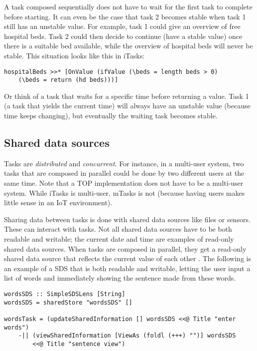 
A task composed sequentially does not have to wait for the first task to complete before starting. It can even be the case that task 2 becomes stable when task 1 still has an unstable value. For example, task 1 could give an overview of free hospital beds. Task 2 could then decide to continue (have a stable value) once there is a suitable bed available, while the overview of hospital beds will never be stable. This situation looks like this in iTasks:

\bigskip\noindent
\begin{verbatim}
hospitalBeds >>* [OnValue (ifValue (\beds = length beds > 0)
    (\beds = return (hd beds)))]
\end{verbatim}

\bigskip
Or think of a task that waits for a specific time before returning a value. Task 1 (a task that yields the current time) will always have an unstable value (because time keeps changing), but eventually the waiting task becomes stable.

\subsection{Shared data sources}\label{section-top-sds}
Tasks are \textit{distributed} and \textit{concurrent}. For instance, in a multi-user system, two tasks that are composed in parallel could be done by two different users at the same time. Note that a TOP implementation does not have to be a multi-user system. While iTasks is multi-user, mTasks is not (because having users makes little sense in an IoT environment).

Sharing data between tasks is done with shared data sources like files or sensors. These can interact with tasks. Not all shared data sources have to be both readable and writable; the current date and time are examples of read-only shared data sources.
When tasks are composed in parallel, they get a read-only shared data source that reflects the current value of each other \cite[\S 2.1]{plasmeijer2012task}. The following is an example of a SDS that is both readable and writable, letting the user input a list of words and immediately showing the sentence made from these words.

\bigskip\noindent
\begin{verbatim}
wordsSDS :: SimpleSDSLens [String]
wordsSDS = sharedStore "wordsSDS" []

wordsTask = (updateSharedInformation [] wordsSDS <<@ Title "enter words")
    -|| (viewSharedInformation [ViewAs (foldl (+++) "")] wordsSDS
        <<@ Title "sentence view")
\end{verbatim}

